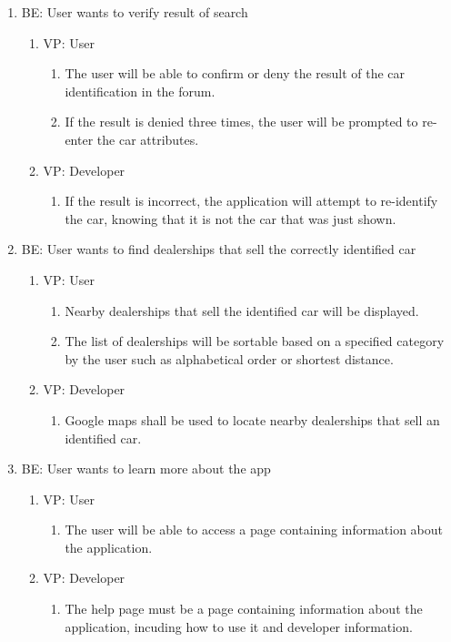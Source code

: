 \documentclass[12pt]{article}
\begin{document}
\begin{enumerate}
	\item BE: User wants to  verify result of search
	\begin{enumerate}
		\item VP: User
		\begin{enumerate}
			\item The user will be able to confirm or deny the result of the car identification in the forum.
			\item If the result is denied three times, the user will be prompted to re-enter the car attributes.
		\end{enumerate}
		\item VP: Developer
		\begin{enumerate}
			\item If the result is incorrect, the application will attempt to re-identify the car, knowing that it is not the car that was just shown.
		\end{enumerate}
	\end{enumerate}

	\item BE: User wants to find dealerships that sell the correctly  identified car
		\begin{enumerate}
		\item VP: User
		\begin{enumerate}
			\item Nearby dealerships that sell the identified car will be displayed.
			\item The list of dealerships will be sortable based on a specified category by the user such as alphabetical order or shortest distance.
		\end{enumerate}
		\item VP: Developer
		\begin{enumerate}
			\item Google maps shall be used to locate nearby dealerships that sell an identified car.
		\end{enumerate}
	\end{enumerate}

	\item BE: User wants to learn more about the app
		\begin{enumerate}
		\item VP: User
		\begin{enumerate}
			\item The user will be able to access a page containing information about the application.
		\end{enumerate}
		\item VP: Developer
		\begin{enumerate}
			\item The help page must be a page containing information about the application, incuding how to use it and developer information.
		\end{enumerate}
	\end{enumerate}


\end{enumerate}
\end{document}
